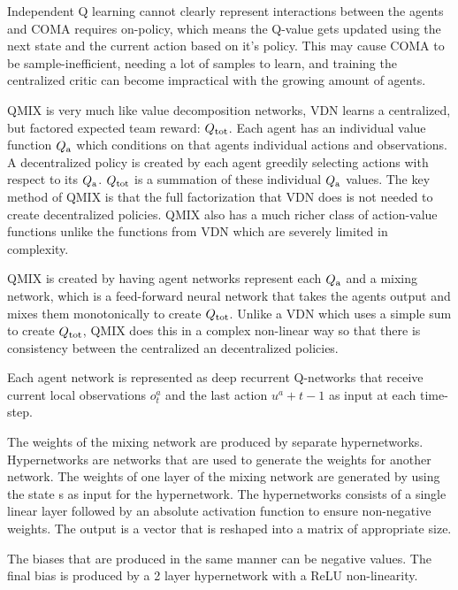 Independent Q learning cannot clearly represent interactions between the agents and COMA requires on-policy, which means the Q-value gets updated using the next state and the current action based on it's policy. This may cause COMA to be sample-inefficient, needing a lot of samples to learn, and training the centralized critic can become impractical with the growing amount of agents.

QMIX is very much like value decomposition networks\citep{sunehag2017value}, VDN learns a centralized, but factored expected team reward: $Q\textsubscript{tot}$. Each agent has an individual value function $Q\textsubscript{a}$ which conditions on that agents individual actions and observations. A decentralized policy is created by each agent greedily selecting actions with respect to its $Q\textsubscript{a}$. $Q\textsubscript{tot}$ is a summation of these individual $Q\textsubscript{a}$  values. The key method of QMIX is that the full factorization that VDN does is not needed to create decentralized policies. QMIX also has a much richer class of action-value functions unlike the functions from VDN which are severely limited in complexity.

QMIX is created by having agent networks represent each $Q\textsubscript{a}$ and a mixing network, which is a feed-forward neural network that takes the agents output and mixes them monotonically to create $Q\textsubscript{tot}$. Unlike a VDN which uses a simple sum to create $Q\textsubscript{tot}$, QMIX does this in a complex non-linear way so that there is consistency between the centralized an decentralized policies. 

Each agent network is represented as deep recurrent Q-networks that receive current local observations $o^{a}_{t}$ and the last action $u^{a}+{t-1}$ as input at each time-step.

The weights of the mixing network are produced by separate hypernetworks. Hypernetworks are networks that are used to generate the weights for another network. The weights of one layer of the mixing network are generated by using the state s as input for the hypernetwork. The hypernetworks consists of a single linear layer followed by an absolute activation function to ensure non-negative weights. The output is a vector that is reshaped into a matrix of appropriate size.

The biases that are produced in the same manner can be negative values. The final bias is produced by a 2 layer hypernetwork with a ReLU non-linearity.


